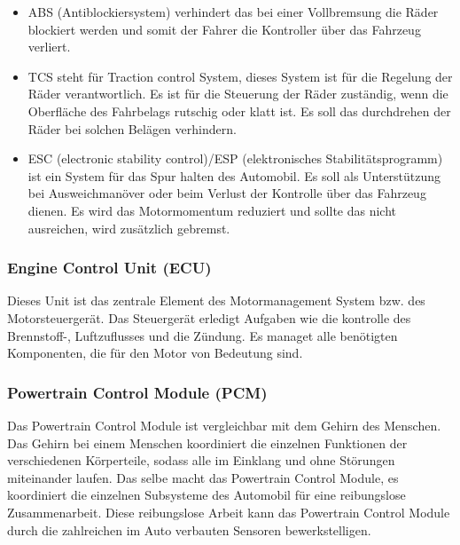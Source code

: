         \begin{itemize}
            \item ABS (Antiblockiersystem) verhindert das bei einer Vollbremsung die Räder
            blockiert werden und somit der Fahrer die Kontroller über das Fahrzeug verliert.
            ~\cite{antiblockiersys.PB1}

            \item TCS steht für Traction control System, dieses System ist für die Regelung der Räder
            verantwortlich. Es ist für die Steuerung der Räder zuständig, wenn die Oberfläche des Fahrbelags
            rutschig oder klatt ist. Es soll das durchdrehen der Räder bei solchen Belägen verhindern.
            ~\cite{tractioncontrol.PB1}

            \item ESC (electronic stability control)/ESP (elektronisches Stabilitätsprogramm) ist ein System
            für das Spur halten des Automobil. Es soll als Unterstützung bei Ausweichmanöver oder beim Verlust
            der Kontrolle über das Fahrzeug dienen. Es wird das Motormomentum reduziert und sollte das nicht
            ausreichen, wird zusätzlich gebremst.
            ~\cite{ESP.PB1}
        \end{itemize}

        \subsubsection{Engine Control Unit (ECU)}
        Dieses Unit ist das zentrale Element des Motormanagement System bzw. des Motorsteuergerät. Das Steuergerät
        erledigt Aufgaben wie die kontrolle des Brennstoff-, Luftzuflusses und die Zündung. Es managet alle
        benötigten Komponenten, die für den Motor von Bedeutung sind.
        ~\cite{enginecontrol.PB1}

        \subsubsection{Powertrain Control Module (PCM)}
        Das Powertrain Control Module ist vergleichbar mit dem Gehirn des Menschen. Das Gehirn bei einem Menschen
        koordiniert die einzelnen Funktionen der verschiedenen Körperteile, sodass alle im Einklang und ohne
        Störungen miteinander laufen. Das selbe macht das Powertrain Control Module, es koordiniert die einzelnen
        Subsysteme des Automobil für eine reibungslose Zusammenarbeit. Diese reibungslose Arbeit kann das Powertrain
        Control Module durch die zahlreichen im Auto verbauten Sensoren bewerkstelligen.
        ~\cite{PCM.PB1}


